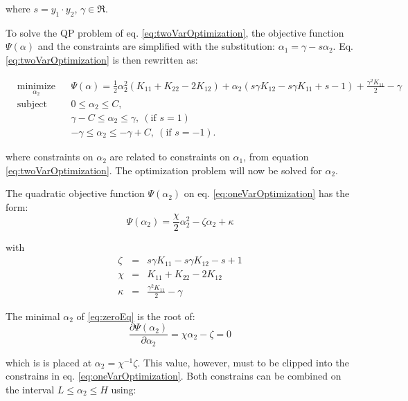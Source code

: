 \documentclass{ipol}
\begin{document}
\noindent where $s=y_1 \cdot y_2$, $\gamma \in \Re$.

To solve the QP problem of eq. \ref{eq:twoVarOptimization}, the objective function $\Psi(\alpha)$ and the constraints are simplified with the substitution: $\alpha_1 = \gamma - s\alpha_2$.
Eq. \ref{eq:twoVarOptimization} is then rewritten as:

\begin{equation}\label{eq:oneVarOptimization}
\begin{aligned}
& \underset{\alpha_2}{\text{minimize}}
& &  \Psi(\alpha) = \frac{1}{2} \alpha_2^2 ( K_{11} + K_{22} - 2 K_{12}) + \alpha_2 ( s \gamma K_{12} - s \gamma K_{11} + s - 1) + \frac{\gamma^2 K_{11}}{2} - \gamma \\
& \text{subject to}
& & 0 \leq \alpha_2 \leq C, \\
&&&\gamma - C \leq \alpha_2 \leq \gamma, \ (\textrm{if }s=1) \\
&&& - \gamma  \leq \alpha_2 \leq - \gamma + C, \ (\textrm{if }s=-1).
\end{aligned}
\end{equation}

\noindent where constraints on $\alpha_2$ are related to constraints on $\alpha_1$, from equation \ref{eq:twoVarOptimization}.
The optimization problem will now be solved for $\alpha_2$.

The quadratic objective function $\Psi(\alpha_2)$ on eq. \ref{eq:oneVarOptimization} has the form:
\begin{equation}
\Psi(\alpha_2) = \frac{\chi}{2}\alpha_2^2 - \zeta \alpha_2 + \kappa \label{eq:zeroEq}
\end{equation}

\noindent with
\begin{eqnarray}
\zeta & = & s \gamma K_{11} - s \gamma K_{12} - s + 1 \\
\chi & = & K_{11} + K_{22} - 2 K_{12} \\
\kappa & = & \frac{\gamma^2 K_{11}}{2} - \gamma
\end{eqnarray}

The  minimal $\alpha_2$ of \ref{eq:zeroEq} is the root of:
\begin{equation}\label{eq:derivada}
\frac{\partial \Psi(\alpha_2)}{\partial \alpha_2} = \chi \alpha_2 - \zeta = 0
\end{equation}

\noindent which is is placed at $\alpha_2=\chi^{-1}\zeta$.
This value, however, must to be clipped into the constrains in eq. \ref{eq:oneVarOptimization}.
Both constrains can be combined on the interval $L \leq \alpha_2 \leq H$ using: 
\end{document}

